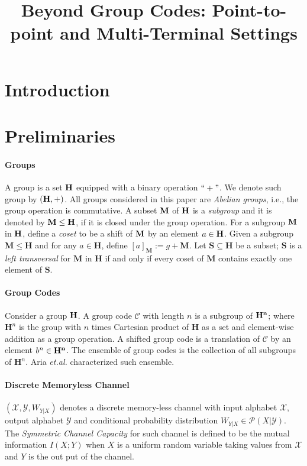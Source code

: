 \documentclass[conference]{IEEEtran}
\theoremstyle{plain}
\theoremstyle{definition}
\theoremstyle{remark}
\begin{document}
\title{Beyond Group Codes: Point-to-point and Multi-Terminal Settings}

\maketitle


\section{Introduction}





\section{Preliminaries}

\paragraph{ \textbf{Groups}} 
A group is a set $\bf H$ equipped with a binary operation $``+"$. We denote such group by $(\bf H,+)$. All groups considered in this paper are \textit{Abelian groups}, i.e., the group operation is commutative. A subset $\bf M$ of $\bf H$ is a \textit{subgroup} and it is denoted by $\bf M \leq H$, if it is closed under the group operation. For a subgroup $\bf M$ in $\bf H$, define a \textit{coset} to be a shift of $\bf M$ by an element $a\in \bf H$. Given a subgroup $\mathbf{M} \leq \mathbf{H}$ and for any $a \in \mathbf{H}$, define $[a]_{\mathbf{M}}:=g+\mathbf{M}$. Let $\mathbf{S} \subseteq \mathbf{H}$ be a subset; $\mathbf{S}$ is a \textit{left transversal} for $\mathbf{M}$ in $\mathbf{H}$ if and only if every coset of $\mathbf{M}$ contains exactly one element of $\mathbf{S}$. 


\paragraph{\textbf{Group Codes}}
Consider a group $\bf H$. A group code $\mathcal{C}$ with length $n$ is a subgroup of $\bf H^n$; where $\mathbf{H}^n$ is the group with $n$ times Cartesian product of $\mathbf{H}$ as a set and element-wise addition as a group operation. A shifted group code is a translation of $\mathcal{C}$ by an element $b^n\in \bf H^n$. The ensemble of group codes is the collection of all subgroups of $\mathbf{H}^n$. Aria \textit{et.al.} \cite{Aria-group} characterized such ensemble. 


\paragraph{\textbf{Discrete Memoryless Channel}}
 $(\mathcal{X},\mathcal{Y}, W_{Y|X})$ denotes a discrete memory-less channel with input alphabet $\mathcal{X}$, output alphabet $\mathcal{Y}$ and conditional probability distribution $W_{Y|X} \in \mathcal{P}(X|\mathcal{Y})$. The \textit{Symmetric Channel Capacity} for such channel is defined to be the mutual information $I(X;Y)$ when $X$ is a uniform random variable taking values from $\mathcal{X}$ and $Y$ is the out put of the channel.
 
\end{document}

